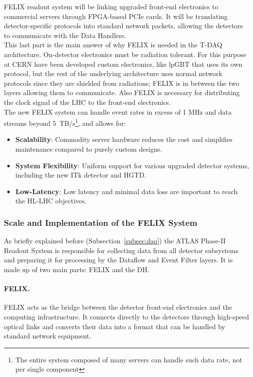 \acs{FELIX} readout system will be linking upgraded front-end electronics to commercial servers through \acs{FPGA}-based \acs{PCIe} cards. It will be translating detector-specific protocols into standard network packets, allowing the detectors to communicate with the Data Handlers.\\
This last part is the main answer of why \acs{FELIX} is needed in the \acs{T-DAQ} architecture. On-detector electronics must be radiation tolerant. For this purpose at \acs{CERN} have been developed custom electronics, like \acl{lpGBT} \cite{lpgbt} that uses its own protocol, but the rest of the underlying architecture uses normal network protocols since they are shielded from radiations; \acs{FELIX} is in between the two layers allowing them to communicate. Also \acs{FELIX} is necessary for distributing the clock signal of the \acs{LHC} to the front-end electronics.\\
The new \acs{FELIX} system can handle event rates in excess of 1 MHz and data streams beyond 5~TB/s\footnote{The entire system composed of many servers can handle such data rate, not per single component}, and allows for:
\begin{itemize}
    \item \textbf{Scalability}: Commodity server hardware reduces the cost and simplifies maintenance compared to purely custom designs.
    \item \textbf{System Flexibility}: Uniform support for various upgraded detector systems, including the new \acs{ITk} detector and \acs{HGTD}.
    \item \textbf{Low-Latency}: Low latency and minimal data loss are important to reach the \acs{HL-LHC} objectives.
\end{itemize}

\subsubsection{Scale and Implementation of the \acs{FELIX} System}

As briefly explained before (Subsection~\ref{subsec:daq}) the \acs{ATLAS} Phase-II Readout System is responsible for collecting data from all detector subsystems and preparing it for processing by the Dataflow and Event Filter layers. It is made up of two main parts: \acs{FELIX} and the \acf{DH}.

\paragraph{FELIX.}
\acf{FELIX} acts as the bridge between the detector front-end electronics and the computing infrastructure. It connects directly to the detectors through high-speed optical links and converts their data into a format that can be handled by standard network equipment.

